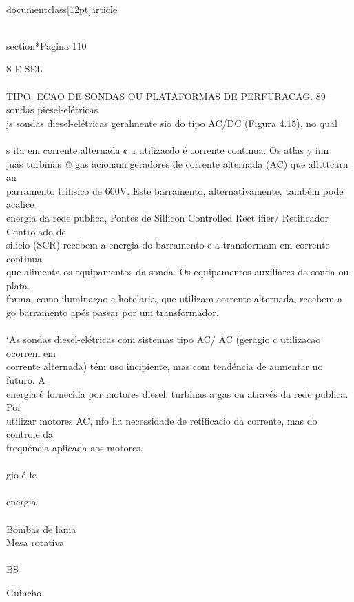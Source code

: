 \\documentclass[12pt]{article}
\begin{document}
{\\section*{Pagina 110}

S E SEL\\
\\
TIPO: ECAO DE SONDAS OU PLATAFORMAS DE PERFURACAG. 89\\
sondas piesel-elétricas\\
js sondas diesel-elétricas geralmente sio do tipo AC/DC (Figura 4.15), no qual\\
\\
s ita em corrente alternada ¢ a utilizacdo é corrente continua. Os atlas y inn\\
juas turbinas @ gas acionam geradores de corrente alternada (AC) que alltttcarn an\\
parramento trifisico de 600V. Este barramento, alternativamente, também pode acalice\\
energia da rede publica, Pontes de Sillicon Controlled Rect ifier/ Retificador Controlado de\\
silicio (SCR) recebem a energia do barramento e a transformam em corrente continua.\\
que alimenta os equipamentos da sonda. Os equipamentos auxiliares da sonda ou plata.\\
forma, como iluminagao e hotelaria, que utilizam corrente alternada, recebem a\\
go barramento apés passar por um transformador.\\
\\
‘As sondas diesel-elétricas com sistemas tipo AC/ AC (geragio ¢ utilizacao ocorrem em\\
corrente alternada) tém uso incipiente, mas com tendéncia de aumentar no futuro. A\\
energia é fornecida por motores diesel, turbinas a gas ou através da rede publica. Por\\
utilizar motores AC, nfo ha necessidade de retificacio da corrente, mas do controle da\\
frequéncia aplicada aos motores.\\
\\
gio é fe\\
\\
energia\\
\\
Bombas de lama\\
Mesa rotativa\\
\\
BS\\} Guincho\\
\end{document}
